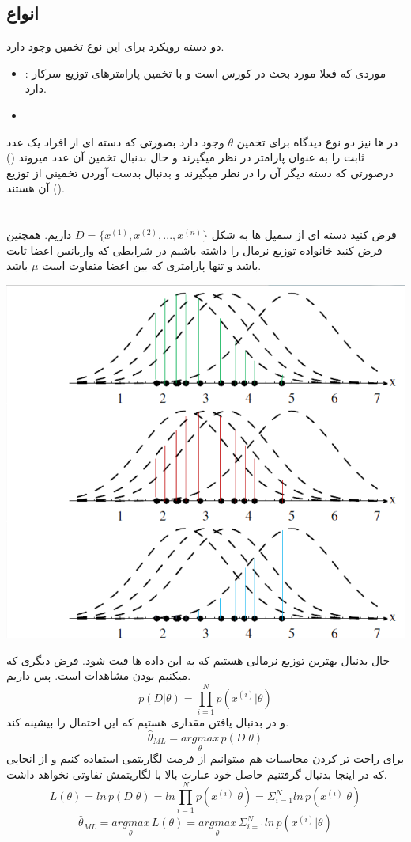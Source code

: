 \documentclass[12pt]{article}
\begin{document}
\subsection*{انواع}
دو دسته رویکرد برای این نوع تخمین وجود دارد.
\begin{itemize}
    \item {}:
    موردی که فعلا مورد بحث در کورس است و با تخمین پارامترهای توزیع سرکار دارد.
    \item {}
\end{itemize}
در 
ها نیز دو نوع دیدگاه برای تخمین 
$\theta$
وجود دارد بصورتی که دسته ای از افراد یک عدد ثابت را به عنوان پارامتر در نظر میگیرند و حال بدنبال تخمین آن عدد میروند
()
درصورتی که دسته دیگر آن را 
در نظر میگیرند و بدنبال بدست آوردن تخمینی از توزیع آن هستند
().

\section*{}
فرض کنید دسته ای از سمپل ها به شکل
$D = \{x^{(1)}, x^{(2)}, ..., x^{(n)}\}$
داریم. همچنین فرض کنید خانواده توزیع نرمال را داشته باشیم در شرایطی که واریانس اعضا ثابت باشد و تنها پارامتری که بین اعضا متفاوت است 
$\mu$
باشد.

\includegraphics[width=\textwidth]{figs/normalDistMLE.png}

حال بدنبال بهترین توزیع نرمالی هستیم که به این داده ها فیت شود. فرض دیگری که میکنیم 
بودن مشاهدات است.
پس داریم.
\[p(D|\theta) = \prod_{i=1}^{N} p(x^{(i)}|\theta)\]
و در 
بدنبال یافتن مقداری هستیم که این احتمال را بیشینه کند.
\[\hat{\theta}_{ML} = \underset{\theta}{argmax} \,p(D|\theta)\]
برای راحت تر کردن محاسبات هم میتوانیم از فرمت لگاریتمی استفاده کنیم و از انجایی که در اینجا بدنبال 
گرفتنیم حاصل خود عبارت بالا با لگاریتمش تفاوتی نخواهد داشت.
\[L(\theta) = ln \,p(D|\theta) = ln \prod_{i = 1}^{N} p(x^{(i)}|\theta) = \Sigma_{i=1}^{N} ln \,p(x^{(i)}|\theta)\]
\[\hat{\theta}_{ML} = \underset{\theta}{argmax}\,L(\theta) = \underset{\theta}{argmax}\, \Sigma_{i=1}^{N} ln \,p(x^{(i)}|\theta)\]
\end{document}
